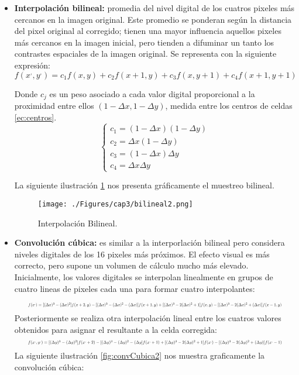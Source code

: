\begin{itemize}
		\item \textbf{Interpolaci\'on bilineal:} promedia del nivel digital de los cuatros pixeles m\'as cercanos en la imagen original. Este promedio se ponderan seg\'un la distancia del pixel original al corregido; tienen una mayor influencia aquellos pixeles m\'as cercanos en la imagen inicial, pero tienden a difuminar un tanto los contrastes espaciales de la imagen original. Se representa con la siguiente expresi\'on:
		\begin{equation}
		f(x^{,},y^{,}) = c_{1}f(x,y)+c_{2}f(x+1,y)+c_{3}f(x,y+1)+c_{4}f(x+1,y+1)
		\end{equation}	

		Donde $ c_{j} $ es un peso asociado a cada valor digital proporcional a la proximidad entre ellos $ (1-\Delta x, 1-\Delta y) $, medida entre los centros de celdas \ref{ec:centros}.
		\begin{equation}\label{ec:centros}
		\begin{cases}
		c_{1} = (1-\Delta x)(1-\Delta y)\\
		c_{2} = \Delta x(1-\Delta y)\\
		c_{3} = (1-\Delta x)\Delta y\\
		c_{4} = \Delta x \Delta y
		\end{cases}
		\end{equation}	
		
		La siguiente ilustraci\'on \ref{fig:bilineal2} nos presenta gr\'aficamente el muestreo bilineal.
		    \begin{figure}[H]
		    	\centering
		    	\texttt{[image: ./Figures/cap3/bilineal2.png]}
		    	\caption{Interpolaci\'on Bilineal.}
		    	\label{fig:bilineal2}
		    \end{figure}
		\item \textbf{Convoluci\'on c\'ubica:} es similar a la interporlaci\'on bilineal pero considera niveles digitales de los 16 pixeles m\'as pr\'oximos. El efecto visual es m\'as correcto, pero supone un volumen de c\'alculo mucho m\'as elevado. Inicialmente, los valores digitales se interpolan linealmente en grupos de cuatro lineas de pixeles cada una para formar cuatro interpolantes:
		
		\begin{equation}
		\resizebox{.9 \textwidth}{!} {$
		f(x^{,}) = [(\Delta x)^{3}-(\Delta x)^{2}]f(x+2,y)-[(\Delta x)^{3}-(\Delta x)^{2}-(\Delta x)]f(x+1,y)+[(\Delta x)^{3}-2(\Delta x)^{2}+1]f(x,y)-[(\Delta x)^{3}-2(\Delta x)^{2}+(\Delta x)]f(x-1,y)
		$}
		\end{equation}	
		Posteriormente se realiza otra interpolaci\'on lineal entre los cuatros valores obtenidos para asignar el resultante a la celda corregida:
		\begin{equation}\resizebox{.9 \textwidth}{!}{$
		f(x^{,},y^{,}) = [(\Delta y)^{3}-(\Delta y)^{2}]f(x^{,}+2)-[(\Delta y)^{3}-(\Delta y)^{2}-(\Delta y]f(x^{,}+1)+[(\Delta y)^{3}-2(\Delta y)^{2}+1]f(x^{,})-[(\Delta y)^{3}-2(\Delta y)^{2}+(\Delta y)]f(x^{,}-1)
		$}
		\end{equation}	
		La siguiente ilustraci\'on \ref{fig:convCubica2} nos muestra graficamente la convoluci\'on c\'ubica:
		

\end{itemize}

